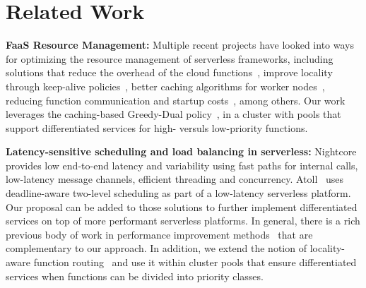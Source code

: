 \section{Related Work}

\noindent\textbf{FaaS Resource Management:}
Multiple recent projects have looked into ways for optimizing the resource management of serverless frameworks, including solutions that
reduce the overhead of the cloud functions~\cite{du2020catalyzer, firecracker-nsdi20, dukic2020photons, akkus_sand_2018, vhive-asplos21, carreira2021warm},
improve locality through keep-alive policies~\cite{Shahrad:ATC:2020:ServerlessInTheWild},
better caching algorithms for worker nodes~\cite{faascache-asplos21},
reducing function communication and startup costs~\cite{gunasekaran2020fifer, daw2021speedo, shen2021defuse}, among others. 
Our work leverages the caching-based Greedy-Dual policy~\cite{faascache-asplos21}, in a cluster with pools that support differentiated services for high- versuls low-priority functions.

\noindent\textbf{Latency-sensitive scheduling and load balancing in serverless:}
Nightcore~\cite{Jia:ASPLOS:2021:Nightcore} provides low end-to-end latency and variability using fast paths for internal calls, low-latency message channels, efficient threading and concurrency.
Atoll~\cite{Singhvi:SoCC:2021:Atoll} uses deadline-aware two-level scheduling as part of a low-latency serverless platform.
Our proposal can be added to those solutions to further implement differentiated services on top of more performant serverless platforms.
In general, there is a rich previous body of work in performance improvement methods~\cite{Oakes:ATC:2018:SOCK,Kaffes:SoCC:2019:Core-Granular,Hunhoff:WoSC:2020:freshen} that are complementary to our approach.
In addition, we extend the notion of locality-aware function routing~\cite{firecracker-nsdi20,package-cristina-19,Fuerst:2022:CH-RLU,Abdi:2023:EuroSys:Palette} and use it within cluster pools that ensure differentiated services when functions can be divided into priority classes. 

